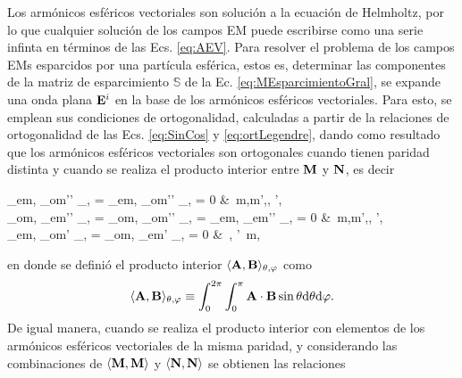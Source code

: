 Los armónicos esféricos vectoriales son solución a la ecuación de Helmholtz, por lo que cualquier solución de los campos EM puede escribirse como una serie infinta en términos de las Ecs. \eqref{eq:AEV}. Para resolver el problema de los campos EMs esparcidos por una partícula esférica, estos es, determinar las componentes de la matriz de esparcimiento $\mathbb{S}$ de la Ec. \eqref{eq:MEsparcimientoGral}, se expande una onda plana $\vb{E}^i$ en la base de los armónicos esféricos vectoriales. Para esto, se emplean sus  condiciones de ortogonalidad, calculadas a partir de la relaciones de ortogonalidad de las Ecs. \eqref{eq:SinCos} y \eqref{eq:ortLegendre}, dando como resultado que los armónicos esféricos vectoriales son ortogonales cuando tienen paridad distinta y cuando se realiza el producto interior entre $\vb{M}$ y $\vb{N}$, es decir \vspace{-.5em}
%
	\begin{tcolorbox}
		\langle{}_{em\ell}, _{om'\ell'} \rangle_{\theta,\varphi} =
		\langle{}_{em\ell}, _{om'\ell'} \rangle_{\theta,\varphi} = 0
		&\qquad \forall\,  m,m',\ell, \ell',\\
		\langle{}_{om\ell}, _{em'\ell'} \rangle_{\theta,\varphi} = 
		\langle{}_{om\ell}, _{om'\ell'} \rangle_{\theta,\varphi} = 	
		\langle{}_{em\ell}, _{em'\ell'} \rangle_{\theta,\varphi} = 0
		&\qquad \forall\,  m,m',\ell, \ell',	\\
		\langle{}_{em\ell},  _{om\ell'} \rangle_{\theta,\varphi} =
		\langle{}_{om\ell},  _{em\ell'} \rangle_{\theta,\varphi} = 0	
		&\qquad \forall\, \ell, \ell'\, m,
	\end{tcolorbox}\vspace{-.5em}\noindent
en donde se definió el producto interior $\langle \vb{A},\vb{B} \rangle_{\theta,\varphi}$ como 
	\begin{align*}
	\langle \vb{A},\vb{B} \rangle_{\theta,\varphi} 
	\equiv 
	\int_0^{2\pi}\int_0^\pi \vb{A}\cdot\vb{B} \sin\theta \dd\theta \dd\varphi.
	\end{align*}
De igual manera, cuando se realiza el producto interior con elementos de los armónicos esféricos vectoriales de la misma paridad, y considerando las combinaciones de  $\langle \vb{M},\vb{M}\rangle$ y $\langle \vb{N},\vb{N}\rangle$  se obtienen las relaciones \vspace{-.5em}
